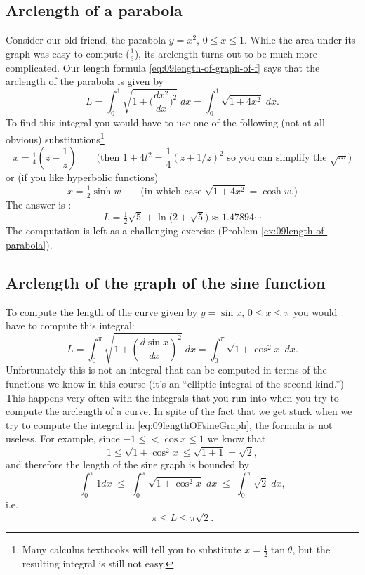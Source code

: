 \subsection{Arclength of a parabola} %
Consider our old friend, the parabola $y=x^2$, $0\leq x\leq 1$.  While the area
under its graph was easy to compute ($\frac13$), its arclength turns out to be much
more complicated.
%
Our length formula \eqref{eq:09length-of-graph-of-f} says that the arclength of the
parabola is given by
\begin{equation}
  L = \int_0^1 \sqrt{1+\bigl(\frac{dx^2}{dx}\bigr)^2}\;dx =\int_0^1
  \sqrt{1+4x^2}\;dx.
  \label{eq:09length-of-parabola}
\end{equation}
To find this integral you would have to use one of the following (not at all
obvious) substitutions\footnote{Many calculus textbooks will tell you to
substitute $x = \frac12\tan\theta$, but the resulting integral is still not
easy. }
\begin{equation}
  x=\tfrac14\left(z-\frac1z\right)\qquad
  \text{(then $1+4t^2 =\frac14(z+1/z)^2 $ so
  you can simplify the $\sqrt{\cdots}$)}
  \label{eq:09rationalizing-substitution}
\end{equation}
or (if you like hyperbolic functions)
\[
  x = \tfrac12\sinh w\qquad \text{(in which case $\sqrt{1+4x^2} = \cosh w$.)}
\]
The answer is :
\[
  L = \tfrac12 \sqrt{5} + \ln\bigl(2+\sqrt{5}\bigr) \approx 1.47894\cdots
\]
The computation is left as a challenging exercise (Problem
\ref{ex:09length-of-parabola}).

\subsection{Arclength of the graph of the sine function} %
To compute the length of the curve given by $y=\sin x$, $0\leq x\leq \pi$ you
would have to compute this integral:
\begin{equation}\label{eq:09lengthOFsineGraph}
  L
  = \int_0^\pi \sqrt{1+\left(\frac{d\sin x}{dx}\right)^2}\; dx
  = \int_0^\pi \sqrt{1+\cos^2 x}\; dx.
\end{equation}%
\marginpar{}%
Unfortunately this is not an integral that can be computed in terms of the
functions we know in this course (it's an ``elliptic integral of the second
kind.'')  This happens very often with the integrals that you run into when you
try to compute the arclength of a curve.  In spite of the fact that we get stuck
when we try to compute the integral in \eqref{eq:09lengthOFsineGraph}, the
formula is not useless.  For example, since $-1\leq <\cos x\leq 1$ we know that
\[
  1\leq \sqrt{1+\cos ^2 x} \leq \sqrt{1+1} = \sqrt2,
\]
and therefore the length of the sine graph is bounded by
\[
  \int_0^\pi 1dx \;\leq\; \int_0^\pi \sqrt{1+\cos^2 x}\; dx \;\leq\;
  \int_0^\pi\sqrt2\;dx,
\]
i.e.
\[
  \pi \leq L \leq \pi\sqrt2.
\]

